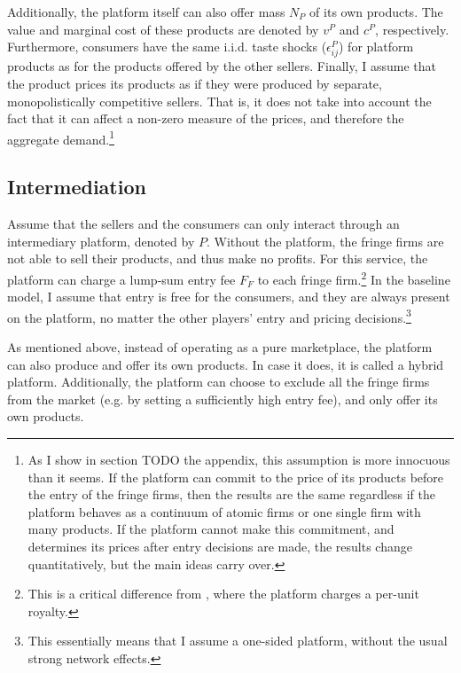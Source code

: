 \documentclass[a4paper]{article}
\begin{document}
Additionally, the platform itself can also offer mass $N_P$ of its own products.
The value and marginal cost of these products are denoted by $v^P$ and $c^P$, respectively.
Furthermore, consumers have the same i.i.d. taste shocks ($\epsilon^P_{ij}$) for platform products as for the products offered by the other sellers.
Finally, I assume that the product prices its products as if they were produced by separate, monopolistically competitive sellers.
That is, it does not take into account the fact that it can affect a non-zero measure of the prices, and therefore the aggregate demand.\footnote{
    As I show in section TODO the appendix, this assumption is more innocuous than it seems.
    If the platform can commit to the price of its products before the entry of the fringe firms, then the results are the same regardless if the platform behaves as a continuum of atomic firms or one single firm with many products.
    If the platform cannot make this commitment, and determines its prices after entry decisions are made, the results change quantitatively, but the main ideas carry over.  %
}

\subsection{Intermediation}

Assume that the sellers and the consumers can only interact through an intermediary platform, denoted by $P$.
Without the platform, the fringe firms are not able to sell their products, and thus make no profits.
For this service, the platform can charge a lump-sum entry fee $F_F$ to each fringe firm.\footnote{
    This is a critical difference from \textcite[]{anderson2021hybrid}, where the platform charges a per-unit royalty.
}
In the baseline model, I assume that entry is free for the consumers, and they are always present on the platform, no matter the other players' entry and pricing decisions.\footnote{
    This essentially means that I assume a one-sided platform, without the usual strong network effects.
}

As mentioned above, instead of operating as a pure marketplace, the platform can also produce and offer its own products.
In case it does, it is called a hybrid platform.
Additionally, the platform can choose to exclude all the fringe firms from the market (e.g. by setting a sufficiently high entry fee), and only offer its own products.  %
\end{document}
